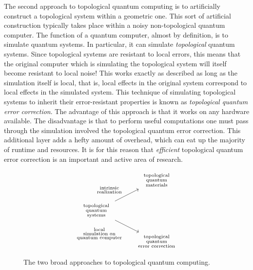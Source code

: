 The second approach to topological quantum computing is to artificially construct a topological system within a geometric one. This sort of artificial construction typically takes place within a noisy non-topological quantum computer. The function of a quantum computer, almost by definition, is to simulate quantum systems. In particular, it can simulate {\em topological} quantum systems. Since topological systems are resistant to local errors, this means that the original computer which is simulating the topological system will itself become resistant to local noise! This works exactly as described as long as the simulation itself is local, that is, local effects in the original system correspond to local effects in the simulated system. This technique of simulating topological systems to inherit their error-resistant properties is known as {\em topological quantum error correction}. The advantage of this approach is that it works on any hardware available. The disadvantage is that to perform useful computations one must pass through the simulation involved the topological quantum error correction. This additional layer adds a hefty amount of overhead, which can eat up the majority of runtime and resources. It is for this reason that {\em efficient} topological quantum error correction is an important and active area of research.

\begin{figure}
\[\begin{tikzcd}
	& \begin{array}{c} \substack{\text{topological}\\ \text{quantum}\\\text{materials}} \end{array} \\
	\begin{array}{c} \substack{\text{topological} \\ \text{quantum} \\ \text{systems}} \end{array} \\
	& \begin{array}{c} \substack{\text{topological}\\\text{quantum}\\ \text{error correction}} \end{array}
	\arrow["\begin{array}{c} \substack{\text{intrinsic}\\\text{realization}} \end{array}", from=2-1, to=1-2]
	\arrow["\begin{array}{c} \substack{\text{local}\\\text{simulation on} \\ \text{quantum computer}} \end{array}"', from=2-1, to=3-2]
\end{tikzcd}\]
\caption{The two broad approaches to topological quantum computing.}
\end{figure}

